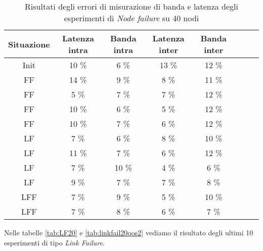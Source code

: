     \begin{table}[H]
    \caption{Risultati degli errori di misurazione di banda e latenza degli esperimenti di \textit{Node failure} su 40 nodi}
    \label{tab:nodefail40qos2}
    \begin{center}
        \begin{tabular}{|c|c|c|c|c|c|c|c|}
            \hline
            Situazione & Latenza intra & Banda intra & Latenza inter & Banda inter\\
            \hline
            Init & 10 \%  & 6 \%   & 13 \%  & 12 \%   \\
            FF    & 14 \%  & 9 \%   & 8 \%   & 11 \%   \\
            FF    & 5 \%   & 7 \%   & 7 \%   & 12 \%   \\
            FF    & 10 \%  & 6 \%   & 5 \%   & 12 \%   \\
            FF    & 10 \%  & 7 \%   & 6 \%   & 12 \%   \\
            LF    & 7 \%   & 6 \%   & 8 \%   & 10 \%   \\
            LF    & 11 \%  & 7 \%   & 6 \%   & 12 \%   \\
            LF    & 7 \%   & 10 \%  & 4 \%   & 6 \%    \\
            LF    & 9 \%   & 7 \%   & 7 \%   & 8 \%    \\
            LFF    & 7 \%   & 9 \%   & 5 \%   & 10 \%   \\
            LFF   & 7 \%   & 8 \%   & 6 \%   & 7 \%    \\
            \hline
        \end{tabular}
        \end{center}
    \end{table}
        
        
        Nelle tabelle \ref{tab:LF20} e \ref{tab:linkfail20qos2} vediamo il risultato degli ultimi 10 esperimenti di tipo \textit{Link Failure}.
        
        
        
